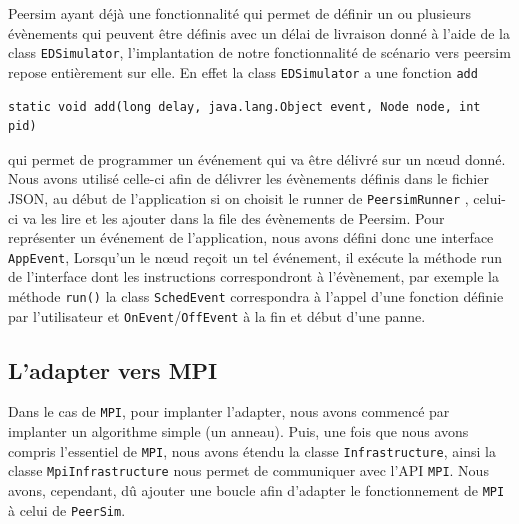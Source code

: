 \documentclass{article}
\begin{document}
						\vspace{5mm}
						Peersim ayant déjà une fonctionnalité qui permet de définir un ou plusieurs évènements qui peuvent être définis avec un délai de livraison donné à l'aide de la class \verb|EDSimulator|,
						l'implantation de notre fonctionnalité de scénario vers peersim repose entièrement sur elle.
						En effet la class \verb|EDSimulator| a une fonction \verb|add|
						\begin{lstlisting}
static void add(long delay, java.lang.Object event, Node node, int pid)
						\end{lstlisting}
						qui permet de programmer un événement qui va être délivré sur un nœud donné. 
						\newline
						Nous avons utilisé celle-ci afin de délivrer les évènements définis dans le fichier JSON, au début de l'application si on choisit le runner de \verb|PeersimRunner| , celui-ci va 
						les lire et les ajouter dans la file des évènements de Peersim.
		Pour représenter un événement de l'application, nous avons défini donc une interface \verb|AppEvent|,
						Lorsqu'un le nœud reçoit un tel événement, il exécute la méthode run de l'interface dont les instructions correspondront à l'évènement, par exemple la méthode \verb|run()| la class \verb|SchedEvent| 
						correspondra à l'appel d'une fonction définie par l'utilisateur et  \verb|OnEvent|/\verb|OffEvent| à la fin et début d'une panne.
			
			\newpage
			\subsection{L'adapter vers MPI}
			Dans le cas de \verb|MPI|, pour implanter l'adapter, nous avons commencé par implanter un algorithme simple (un anneau). Puis, une fois que nous avons compris l'essentiel de \verb|MPI|, nous avons étendu la classe \verb|Infrastructure|, ainsi la classe \verb|MpiInfrastructure| nous permet de communiquer avec l'API \verb|MPI|. 
			Nous avons, cependant, dû ajouter une boucle afin d'adapter le fonctionnement de \verb|MPI| à celui de \verb|PeerSim|.
\end{document}
